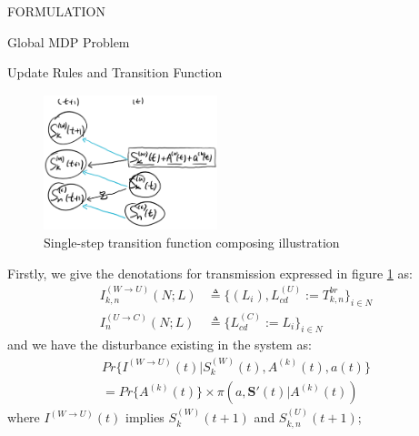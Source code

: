 \documentclass[10pt, conference, letterpaper]{IEEEtran}
\begin{document}
\begin{section}{FORMULATION}
\begin{subsection}{Global MDP Problem}
            \begin{subsubsection}{Update Rules and Transition Function}
                \begin{figure}[h]
                    \centering
                    \includegraphics[width=0.45\textwidth]{single-transition.png}
                    \caption{Single-step transition function composing illustration}
                    \label{fig:trans}
                \end{figure}

                Firstly, we give the denotations for transmission expressed in figure \ref{fig:trans} as:
                \begin{align}
                    I^{(W \to U)}_{k,n}(N;L) &\triangleq \{ (L_i),L^{(U)}_{cd}:=T^{br}_{k,n} \}_{i \in N}
                        \\
                    I^{(U \to C)}_{n}(N;L) &\triangleq \{ L^{(C)}_{cd}:=L_i \}_{i \in N}
                \end{align}
                and we have the disturbance existing in the system as:
                \begin{gather*}
                    Pr\{ I^{(W \to U)}(t) | S_{k}^{(W)}(t),A^{(k)}(t), a(t) \}
                    \\
                        = Pr\{ A^{(k)}(t) \} \times \pi(a, \mathbf{S}'(t)|A^{(k)}(t))
                \end{gather*}
                where $I^{(W \to U)}(t)$ implies $S^{(W)}_{k}(t+1)$ and $S^{(U)}_{k,n}(t+1)$;


\end{subsubsection}
\end{subsection}
\end{section}
\end{document}
